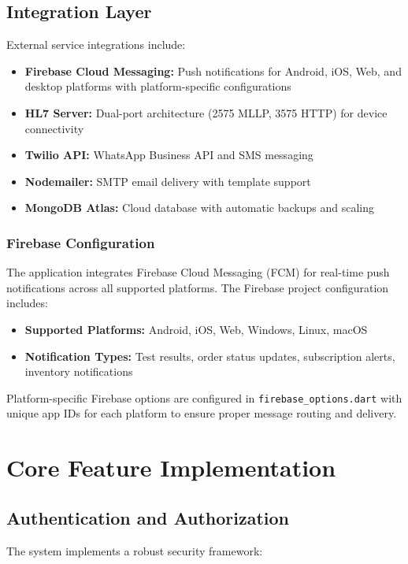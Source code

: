 \documentclass[12pt, a4paper]{report}
\begin{document}
\subsection{Integration Layer}
External service integrations include:
\begin{itemize}
    \item \textbf{Firebase Cloud Messaging:} Push notifications for Android, iOS, Web, and desktop platforms with platform-specific configurations
    \item \textbf{HL7 Server:} Dual-port architecture (2575 MLLP, 3575 HTTP) for device connectivity
    \item \textbf{Twilio API:} WhatsApp Business API and SMS messaging
    \item \textbf{Nodemailer:} SMTP email delivery with template support
    \item \textbf{MongoDB Atlas:} Cloud database with automatic backups and scaling
\end{itemize}

\subsubsection{Firebase Configuration}
The application integrates Firebase Cloud Messaging (FCM) for real-time push notifications across all supported platforms. The Firebase project configuration includes:

\begin{itemize}
    \item \textbf{Supported Platforms:} Android, iOS, Web, Windows, Linux, macOS
    \item \textbf{Notification Types:} Test results, order status updates, subscription alerts, inventory notifications
\end{itemize}

Platform-specific Firebase options are configured in \texttt{firebase\_options.dart} with unique app IDs for each platform to ensure proper message routing and delivery.

\section{Core Feature Implementation}

\subsection{Authentication and Authorization}
The system implements a robust security framework:
\end{document}
